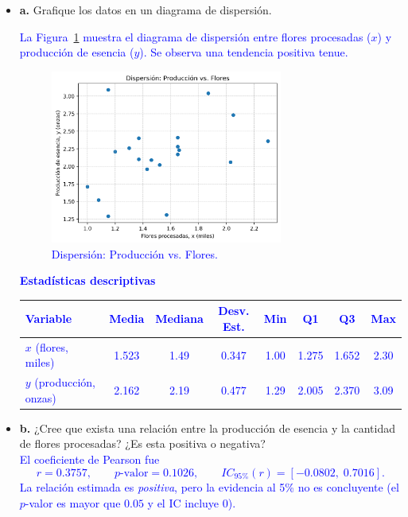 \documentclass[10pt]{article}
\begin{document}
\begin{itemize}
    \item \textbf{a.} Grafique los datos en un diagrama de dispersión.\\
\textcolor{blue}{
La Figura~\ref{fig:fl_scatter} muestra el diagrama de dispersión entre flores procesadas ($x$) y producción de esencia ($y$). Se observa una tendencia positiva tenue.\\
\begin{figure}[H]
    \centering
    \includegraphics[width=0.72\textwidth]{../plots/python/ejercicio3/scatter_flowers.png}
    \caption{Dispersión: Producción vs. Flores.}
    \label{fig:fl_scatter}
\end{figure}
\noindent\textbf{Estadísticas descriptivas }
\begin{center}
\begin{tabular}{lccccccc}
\hline
Variable & Media & Mediana & Desv. Est. & Min & Q1 & Q3 & Max \\
\hline
$x$ (flores, miles) & 1.523 & 1.49 & 0.347 & 1.00 & 1.275 & 1.652 & 2.30 \\
$y$ (producción, onzas) & 2.162 & 2.19 & 0.477 & 1.29 & 2.005 & 2.370 & 3.09 \\
\hline
\end{tabular}
\end{center}
}

    \item \textbf{b.} ¿Cree que exista una relación entre la producción de esencia y la cantidad de flores procesadas? ¿Es esta positiva o negativa?\\
\textcolor{blue}{
El coeficiente de Pearson fue
\[ r = 0.3757, \qquad p\text{-valor} = 0.1026, \qquad IC_{95\%}(r) = [-0.0802,\;0.7016]. \]
La relación estimada es \emph{positiva}, pero la evidencia al 5\% no es concluyente (el $p$-valor es mayor que $0.05$ y el IC incluye 0).
}


\end{itemize}
\end{document}
